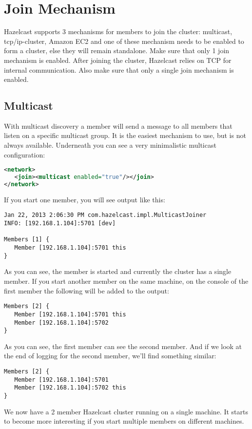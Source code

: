 \section{Join Mechanism }
Hazelcast supports 3 mechanisms for members to join the cluster: multicast, tcp/ip-cluster, Amazon EC2 and one of these mechanism needs to be enabled to form a cluster, else they will remain standalone. Make sure that only 1 join mechanism is enabled. After joining the cluster, Hazelcast relies on TCP for internal communication. Also make sure that only a single join mechanism is enabled.

\subsection{Multicast}
With multicast discovery a member will send a message to all members that listen on a specific multicast group. It is the easiest mechanism to use, but is not always available. Underneath you can see a very minimalistic multicast configuration:
\begin{lstlisting}[language=xml]
<network>
   <join><multicast enabled="true"/></join>
</network>
\end{lstlisting}
If you start one member, you will see output like this:
\begin{lstlisting}
Jan 22, 2013 2:06:30 PM com.hazelcast.impl.MulticastJoiner
INFO: [192.168.1.104]:5701 [dev] 

Members [1] {
   Member [192.168.1.104]:5701 this
}
\end{lstlisting}	
As you can see, the member is started and currently the cluster has a single member. If you start another member on the same machine, on the console of the first member the following will be added to the output:
\begin{lstlisting}
Members [2] {
   Member [192.168.1.104]:5701 this
   Member [192.168.1.104]:5702
}
\end{lstlisting}	
As you can see, the first member can see the second member. And if we look at the end of logging for the second member, we'll find something similar:
\begin{lstlisting}
Members [2] {
   Member [192.168.1.104]:5701
   Member [192.168.1.104]:5702 this
}
\end{lstlisting}		
We now have a 2 member Hazelcast cluster running on a single machine. It starts to become more interesting if you start multiple members on different machines.


